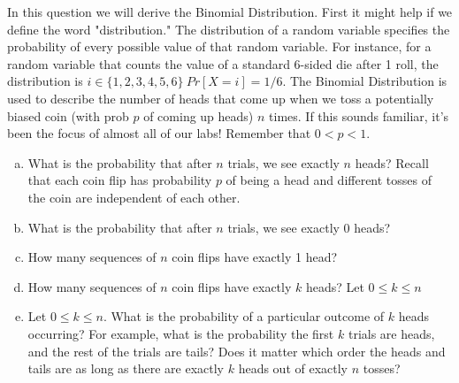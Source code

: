 \documentclass[]{article}
\newif\ifsolutions
\renewcommand{\answer}[1]{{\color{mydarkblue}\textbf{Solution:}#1}}
\begin{document}
\begin{qunlist}
In this question we will derive the Binomial Distribution. First it might help if we define the word "distribution." The distribution of a random variable specifies the probability of every possible value of that random variable. For instance, for a random variable that counts the value of a standard 6-sided die after 1 roll, the distribution is $i \in \{1,2,3,4,5,6\} \ Pr[X = i] = 1/6$. %
The Binomial Distribution is used to describe the number of heads that
come up when we toss a potentially biased coin (with prob $p$ of
coming up heads) $n$ times. If this sounds familiar, it's been the focus of almost all of our labs! Remember that $0 < p < 1$.
\begin{enumerate}[a)]
\qpart
\item What is the probability that after $n$ trials, we see exactly
  $n$ heads? Recall that each coin flip has probability $p$ of being a
  head and different tosses of the coin are independent of each other.
  
  \ifsolutions{ \answer {
  Each trial is independent, and the probability of a head for each trial is $p$ so we have probability $p^n$
  }} 
  \fi
\qpart
\item What is the probability that after $n$ trials, we see exactly $0$ heads?

 \ifsolutions{ \answer {
   Each trial is independent, and the probability of a head for each trial is $1-p$ so we have probability $(1-p)^n$
  }} 
  \fi
\qpart
\item How many sequences of $n$ coin flips have exactly 1 head?

 \ifsolutions{ \answer {
  $n$. We simply choose $1$ of the $n$ flips to be a head so we get $\binom{n}{1}$
  }} 
  \fi
\qpart
\item How many sequences of $n$ coin flips have exactly $k$ heads? Let  $0 \leq k \leq n$

 \ifsolutions{ \answer {
  This time, we count the ways to choose $k$ of the $n$ flips to be a head, so we get $\binom{n}{k}$
  }} 
  \fi 
\qpart
\item  Let  $0 \leq k \leq n$. What is the probability of a particular
  outcome of $k$ heads occurring? For example, what is the probability
  the first $k$ trials are heads, and the rest of the trials are
  tails? Does it matter which order the heads and tails are as long as
  there are exactly $k$ heads out of exactly $n$ tosses?
\qpart


\end{enumerate}
\end{qunlist}
\end{document}

